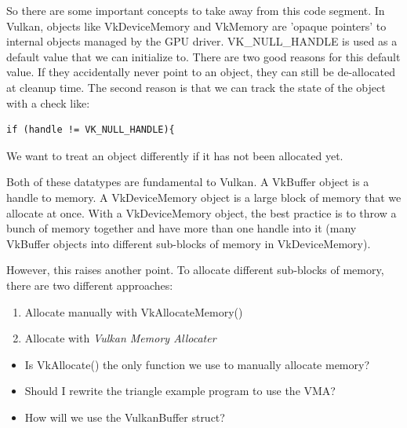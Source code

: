 \documentclass{article}
\begin{document}
\begin{tcolorbox}[
  enhanced,
  breakable,
  colback=green!5,
  colframe=green!45!black,
  sharp corners=all,
  boxrule=0.8pt,
  left=5pt,
  right=5pt,
  top=6pt,
  bottom=6pt,
  parbox=false
]
\par So there are some important concepts to take away from this code
segment. In Vulkan, objects like VkDeviceMemory and VkMemory are
'opaque pointers' to internal objects managed by the GPU driver.
VK\_NULL\_HANDLE is used as a default value that we can initialize
to. There are two good reasons for this default value. If they
accidentally never point to an object, they can still be de-allocated
at cleanup time. The second reason is that we can track the state of
the object with a check like:
\begin{verbatim}
if (handle != VK_NULL_HANDLE){
\end{verbatim}

\par We want to treat an object differently if it has not been allocated yet.

\par Both of these datatypes are fundamental to Vulkan. A VkBuffer
object is a handle to memory. A VkDeviceMemory object is a large
block of memory that we allocate at once. With a VkDeviceMemory
object, the best practice is to throw a bunch of memory together and have more
than one handle into it (many VkBuffer objects into different
sub-blocks of memory in VkDeviceMemory).

\par However, this raises another point. To allocate different
sub-blocks of memory, there are two different approaches:
\begin{enumerate}
  \item Allocate manually with VkAllocateMemory()
  \item Allocate with \textit{Vulkan Memory Allocater}
\end{enumerate}
\end{tcolorbox}

\begin{tcolorbox}[
  enhanced,
  breakable,
  colback=blue!3,
  colframe=blue!60!black,
  sharp corners=all,
  boxrule=0.8pt,
  left=5pt,
  right=5pt,
  top=6pt,
  bottom=6pt,
  parbox=false
]
\begin{itemize}
  \item Is VkAllocate() the only function we use to manually allocate memory?
  \item Should I rewrite the triangle example program to use the VMA?
  \item How will we use the VulkanBuffer struct?
\end{itemize}
\end{tcolorbox}
\end{document}
